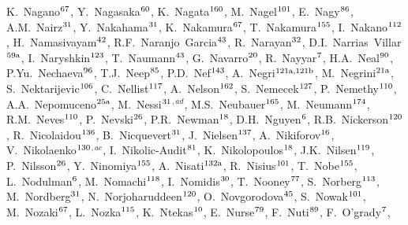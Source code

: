 \begin{flushleft}
K.~Nagano$^\textrm{\scriptsize 67}$,
Y.~Nagasaka$^\textrm{\scriptsize 60}$,
K.~Nagata$^\textrm{\scriptsize 160}$,
M.~Nagel$^\textrm{\scriptsize 101}$,
E.~Nagy$^\textrm{\scriptsize 86}$,
A.M.~Nairz$^\textrm{\scriptsize 31}$,
Y.~Nakahama$^\textrm{\scriptsize 31}$,
K.~Nakamura$^\textrm{\scriptsize 67}$,
T.~Nakamura$^\textrm{\scriptsize 155}$,
I.~Nakano$^\textrm{\scriptsize 112}$,
H.~Namasivayam$^\textrm{\scriptsize 42}$,
R.F.~Naranjo~Garcia$^\textrm{\scriptsize 43}$,
R.~Narayan$^\textrm{\scriptsize 32}$,
D.I.~Narrias~Villar$^\textrm{\scriptsize 59a}$,
I.~Naryshkin$^\textrm{\scriptsize 123}$,
T.~Naumann$^\textrm{\scriptsize 43}$,
G.~Navarro$^\textrm{\scriptsize 20}$,
R.~Nayyar$^\textrm{\scriptsize 7}$,
H.A.~Neal$^\textrm{\scriptsize 90}$,
P.Yu.~Nechaeva$^\textrm{\scriptsize 96}$,
T.J.~Neep$^\textrm{\scriptsize 85}$,
P.D.~Nef$^\textrm{\scriptsize 143}$,
A.~Negri$^\textrm{\scriptsize 121a,121b}$,
M.~Negrini$^\textrm{\scriptsize 21a}$,
S.~Nektarijevic$^\textrm{\scriptsize 106}$,
C.~Nellist$^\textrm{\scriptsize 117}$,
A.~Nelson$^\textrm{\scriptsize 162}$,
S.~Nemecek$^\textrm{\scriptsize 127}$,
P.~Nemethy$^\textrm{\scriptsize 110}$,
A.A.~Nepomuceno$^\textrm{\scriptsize 25a}$,
M.~Nessi$^\textrm{\scriptsize 31}$$^{,ad}$,
M.S.~Neubauer$^\textrm{\scriptsize 165}$,
M.~Neumann$^\textrm{\scriptsize 174}$,
R.M.~Neves$^\textrm{\scriptsize 110}$,
P.~Nevski$^\textrm{\scriptsize 26}$,
P.R.~Newman$^\textrm{\scriptsize 18}$,
D.H.~Nguyen$^\textrm{\scriptsize 6}$,
R.B.~Nickerson$^\textrm{\scriptsize 120}$,
R.~Nicolaidou$^\textrm{\scriptsize 136}$,
B.~Nicquevert$^\textrm{\scriptsize 31}$,
J.~Nielsen$^\textrm{\scriptsize 137}$,
A.~Nikiforov$^\textrm{\scriptsize 16}$,
V.~Nikolaenko$^\textrm{\scriptsize 130}$$^{,ac}$,
I.~Nikolic-Audit$^\textrm{\scriptsize 81}$,
K.~Nikolopoulos$^\textrm{\scriptsize 18}$,
J.K.~Nilsen$^\textrm{\scriptsize 119}$,
P.~Nilsson$^\textrm{\scriptsize 26}$,
Y.~Ninomiya$^\textrm{\scriptsize 155}$,
A.~Nisati$^\textrm{\scriptsize 132a}$,
R.~Nisius$^\textrm{\scriptsize 101}$,
T.~Nobe$^\textrm{\scriptsize 155}$,
L.~Nodulman$^\textrm{\scriptsize 6}$,
M.~Nomachi$^\textrm{\scriptsize 118}$,
I.~Nomidis$^\textrm{\scriptsize 30}$,
T.~Nooney$^\textrm{\scriptsize 77}$,
S.~Norberg$^\textrm{\scriptsize 113}$,
M.~Nordberg$^\textrm{\scriptsize 31}$,
N.~Norjoharuddeen$^\textrm{\scriptsize 120}$,
O.~Novgorodova$^\textrm{\scriptsize 45}$,
S.~Nowak$^\textrm{\scriptsize 101}$,
M.~Nozaki$^\textrm{\scriptsize 67}$,
L.~Nozka$^\textrm{\scriptsize 115}$,
K.~Ntekas$^\textrm{\scriptsize 10}$,
E.~Nurse$^\textrm{\scriptsize 79}$,
F.~Nuti$^\textrm{\scriptsize 89}$,
F.~O'grady$^\textrm{\scriptsize 7}$,

\end{flushleft}
